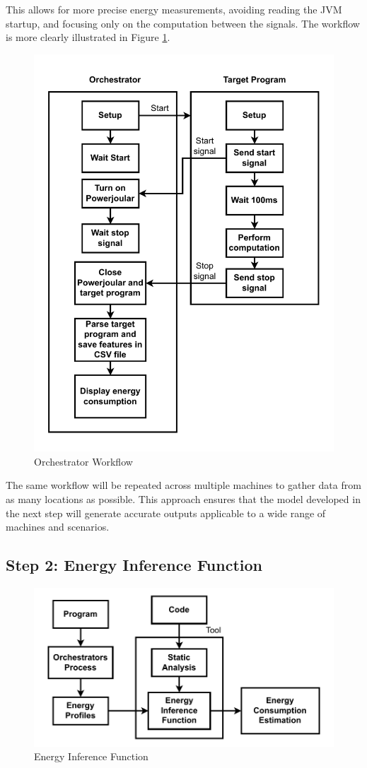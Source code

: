 \documentclass[sigplan]{acmart}
\begin{document}
This allows for more precise energy measurements, avoiding reading the JVM startup, and focusing only on the computation between the signals. The workflow is more clearly illustrated in Figure \ref{fig:orchestrators_process}.

\begin{figure}
  \centering
  \includegraphics[width = 0.4 \textwidth]{figures/orchestrators_process.pdf}
  \caption{Orchestrator Workflow}
  \label{fig:orchestrators_process}
\end{figure}

The same workflow will be repeated across multiple machines to gather data from as many locations as possible. This approach ensures that the model developed in the next step will generate accurate outputs applicable to a wide range of machines and scenarios.

\subsection{Step 2: Energy Inference Function} \label{sec:work_step2_energy_inference_function}

\begin{figure}%
  \centering
  \includegraphics[width = 0.4 \textwidth]{figures/energy_inf_fun.pdf}
  \caption{Energy Inference Function}
  \label{fig:energy_inference_function}
\end{figure}

\end{document}
